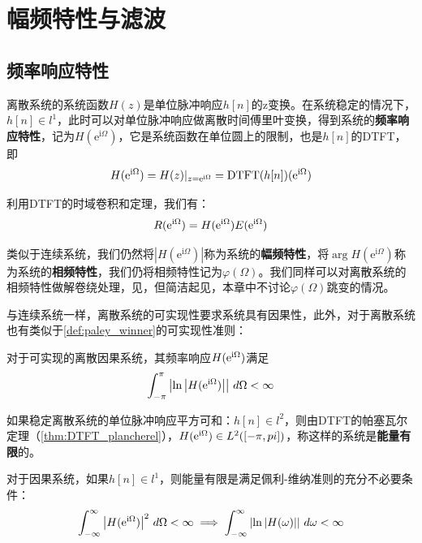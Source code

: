 \section{幅频特性与滤波}\label{sec:Magnitude_and_Filter}

\subsection{频率响应特性}\label{sub:discrete_system_freq_response}

离散系统的系统函数$H(z)$是单位脉冲响应$h[n]$的z变换。在系统稳定的情况下，$h[n]\in l^1$，此时可以对单位脉冲响应做离散时间傅里叶变换，得到系统的\textbf{频率响应特性}，记为$H(\mathrm{e}^{\mathrm{i}\Omega})$，它是系统函数在单位圆上的限制，也是$h[n]$的DTFT，即
$$H(\mathrm{e}^{\mathrm{i}\Omega})=H(z)|_{z=\mathrm{e}^{\mathrm{i}\Omega}}=\operatorname{DTFT}(h[n])(\mathrm{e}^{\mathrm{i}\Omega})$$

利用DTFT的时域卷积和定理，我们有：
$$R(\mathrm{e}^{\mathrm{i}\Omega})=H(\mathrm{e}^{\mathrm{i}\Omega})E(\mathrm{e}^{\mathrm{i}\Omega})$$

类似于连续系统，我们仍然将$|H(\mathrm{e}^{\mathrm{i}\Omega})|$称为系统的\textbf{幅频特性}，将$\arg H(\mathrm{e}^{\mathrm{i}\Omega})$称为系统的\textbf{相频特性}，我们仍将相频特性记为$\varphi(\Omega)$。我们同样可以对离散系统的相频特性做解卷绕处理，见，但简洁起见，本章中不讨论$\varphi(\Omega)$跳变的情况。

与连续系统一样，离散系统的可实现性要求系统具有因果性，此外，对于离散系统也有类似于\cref{def:paley_winner}的可实现性准则：

\begin{definition}
    对于可实现的离散因果系统，其频率响应$H(\mathrm{e}^{\mathrm{i}\Omega})$满足
    $$\int_{-\pi}^\pi \left|\ln\left|H(\mathrm{e}^{\mathrm{i}\Omega})\right|\right|\,d\Omega<\infty$$
\end{definition}

\begin{definition}[离散能量有限系统]
    如果稳定离散系统的单位脉冲响应平方可和：$h[n]\in l^2$，则由DTFT的帕塞瓦尔定理（\cref{thm:DTFT_plancherel}），$H(\mathrm{e}^{\mathrm{i}\Omega})\in L^2([-\pi,pi])$，称这样的系统是\textbf{能量有限}的。
\end{definition}

\begin{claim}
    对于因果系统，如果$h[n]\in l^1$，则能量有限是满足佩利-维纳准则的充分不必要条件：
    \[\int_{-\infty}^{\infty}\left|H(\mathrm{e}^{\mathrm{i}\Omega})\right|^2\,d\Omega<\infty\implies\int_{-\infty}^{\infty}\left|\ln|H(\omega)|\right|\,d\omega<\infty\]
\end{claim}

